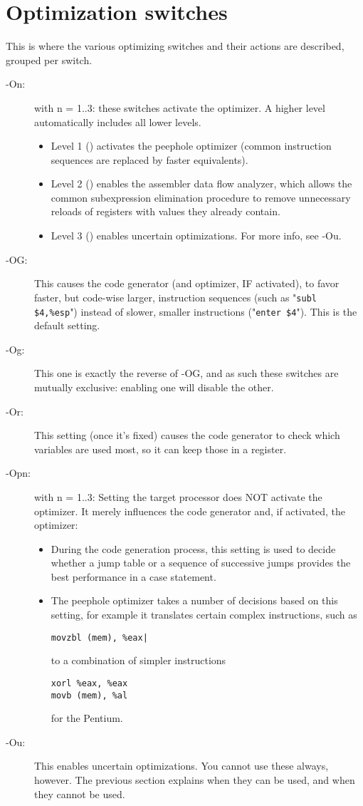 \section{Optimization switches}
This is where the various optimizing switches and their actions are
described, grouped per switch.

\begin{description}
\item [-On:\ ] with n = 1..3: these switches activate the optimizer.
A higher level automatically includes all lower levels.
\begin{itemize}
\item Level 1 () activates the peephole optimizer
 (common instruction sequences are replaced by faster equivalents).
\item Level 2 () enables the assembler data flow analyzer,
which allows the common subexpression elimination procedure to
remove unnecessary reloads of registers with values they already contain.
\item Level 3 () enables uncertain optimizations. For more info, see -Ou.
\end{itemize}
\item[-OG:\ ]
This causes the code generator (and optimizer, IF activated), to favor
faster, but code-wise larger, instruction sequences (such as
"\verb|subl $4,%esp|") instead of slower, smaller instructions
("\verb|enter $4|").  This is the default setting.

\item[-Og:\ ] This one is exactly the reverse of -OG, and as such these
switches are mutually exclusive: enabling one will disable the other.

\item[-Or:\ ] This setting (once it's fixed) causes the code generator to
check which variables are used most, so it can keep those in a register.

\item[-Opn:\ ] with n = 1..3: Setting the target processor does NOT
activate the optimizer. It merely influences the code generator and,
if activated, the optimizer:
\begin{itemize}
\item During the code generation process, this setting is used to
decide whether a jump table or a sequence of successive jumps provides
the best performance in a case statement.
\item The peephole optimizer takes a number of decisions based on this
setting, for example it translates certain complex instructions, such
as
\begin{verbatim}
movzbl (mem), %eax|
\end{verbatim}
to a combination of simpler instructions
\begin{verbatim}
xorl %eax, %eax
movb (mem), %al
\end{verbatim}
for the Pentium.
\end{itemize}
\item[-Ou:\ ] This enables uncertain optimizations. You cannot use these
always, however. The previous section explains when they can be used, and
when they cannot be used.
\end{description}

